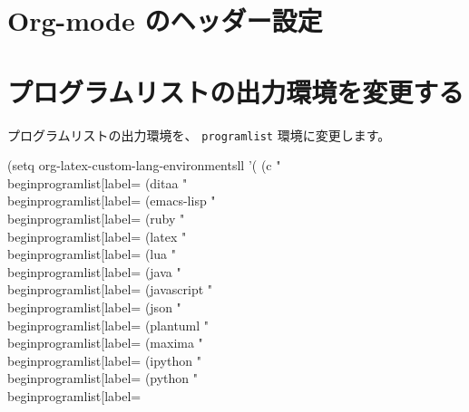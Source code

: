 \documentclass[dvipdfmx,a4j,14pt,uplatex,openany]{jsbook}
\begin{document}
\section{Org-mode のヘッダー設定}
\label{sec:orgeb5eefc}

\section{プログラムリストの出力環境を変更する}
\label{sec:org5b0f1c7}
プログラムリストの出力環境を、  \texttt{programlist} 環境に変更します。

\begin{exampleoutput}
(setq org-latex-custom-lang-environmentsll
'(
(c "\\begin{programlist}[label={%
(ditaa "\\begin{programlist}[label={%
(emacs-lisp "\\begin{programlist}[label={%
(ruby "\\begin{programlist}[label={%
(latex "\\begin{programlist}[label={%
(lua "\\begin{programlist}[label={%
(java "\\begin{programlist}[label={%
(javascript "\\begin{programlist}[label={%
(json "\\begin{programlist}[label={%
(plantuml "\\begin{programlist}[label={%
(maxima "\\begin{programlist}[label={%
(ipython "\\begin{programlist}[label={%
(python "\\begin{programlist}[label={%
}}}}}}}}}}}}}
\end{exampleoutput}
\end{document}
